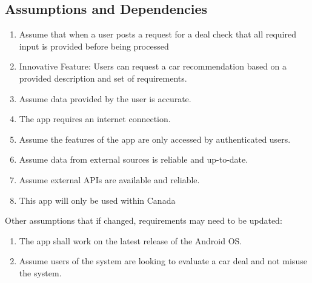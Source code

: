 \documentclass[]{article}
\begin{document}
\subsection{Assumptions and Dependencies}
\label{sub:assumptions_and_dependencies}
\begin{enumerate}
\item Assume that when a user posts a request for a deal check that all required input is provided before being processed
\item Innovative Feature: Users can request a car recommendation based on a provided description and set of requirements.
\item Assume data provided by the user is accurate.
\item The app requires an internet connection.
\item Assume the features of the app are only accessed by authenticated users.
\item Assume data from external sources is reliable and up-to-date.
\item Assume external APIs are available and reliable.
\item This app will only be used within Canada
\end{enumerate}

Other assumptions that if changed, requirements may need to be updated:
\begin{enumerate}
\item The app shall work on the latest release of the Android OS.
\item Assume users of the system are looking to evaluate a car deal and not misuse the system.
\end{enumerate}
\end{document}
